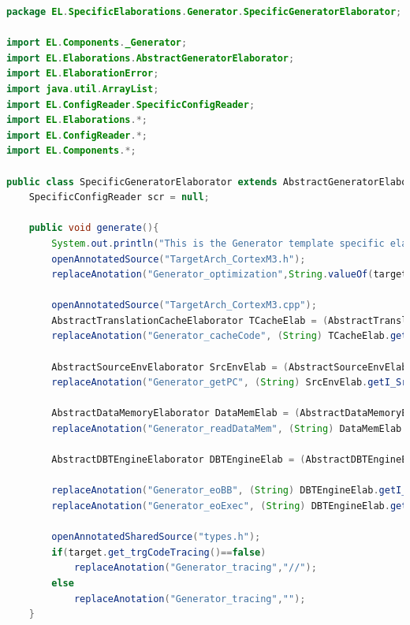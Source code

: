 \begin{lstlisting}[language=Java, caption=Generator Specific Elaborator., label=lst:genElab]
package EL.SpecificElaborations.Generator.SpecificGeneratorElaborator;  

import EL.Components._Generator;
import EL.Elaborations.AbstractGeneratorElaborator;
import EL.ElaborationError;
import java.util.ArrayList;
import EL.ConfigReader.SpecificConfigReader;
import EL.Elaborations.*;
import EL.ConfigReader.*;
import EL.Components.*;

public class SpecificGeneratorElaborator extends AbstractGeneratorElaborator {
	SpecificConfigReader scr = null;

	public void generate(){
		System.out.println("This is the Generator template specific elaboration.");
		openAnnotatedSource("TargetArch_CortexM3.h");
		replaceAnotation("Generator_optimization",String.valueOf(target.get_optimizations()));

		openAnnotatedSource("TargetArch_CortexM3.cpp");		
		AbstractTranslationCacheElaborator TCacheElab = (AbstractTranslationCacheElaborator) getElaborator((_TranslationCache) target.get_r_TCache());
		replaceAnotation("Generator_cacheCode", (String) TCacheElab.getI_TCacheElaboratorCacheCode());

		AbstractSourceEnvElaborator SrcEnvElab = (AbstractSourceEnvElaborator) getElaborator((_SourceEnv) target.get_r_SrcEnv());
		replaceAnotation("Generator_getPC", (String) SrcEnvElab.getI_SrcEnvElaboratorGetPC());

		AbstractDataMemoryElaborator DataMemElab = (AbstractDataMemoryElaborator) getElaborator((_DataMemory) target.get_r_DMem());
		replaceAnotation("Generator_readDataMem", (String) DataMemElab.getI_DMemElaboratorReadDataMem());

		AbstractDBTEngineElaborator DBTEngineElab = (AbstractDBTEngineElaborator) getElaborator((_DBTEngine) target.get_r_EngineState());		

		replaceAnotation("Generator_eoBB", (String) DBTEngineElab.getI_EngineStateElaboratorEoBB());
		replaceAnotation("Generator_eoExec", (String) DBTEngineElab.getI_EngineStateElaboratorEoExec());

		openAnnotatedSharedSource("types.h");
		if(target.get_trgCodeTracing()==false)
			replaceAnotation("Generator_tracing","//");
		else
			replaceAnotation("Generator_tracing","");
	}
\end{lstlisting}